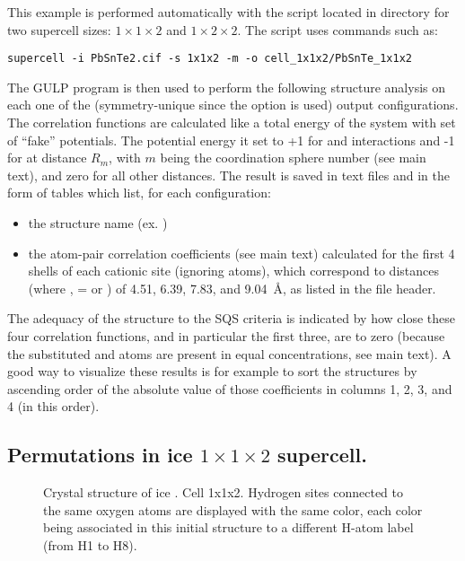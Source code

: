 \documentclass[a4paper,10pt]{article}
\begin{document}
This example is performed automatically with the script  located in directory  for two supercell sizes: $1\times1\times2$ and $1\times2\times2$. The script uses \sups{} commands such as:
\begin{Verbatim}[breaklines]
  supercell -i PbSnTe2.cif -s 1x1x2 -m -o cell_1x1x2/PbSnTe_1x1x2
\end{Verbatim}
The GULP program is then used to perform the following structure analysis on each one of the (symmetry-unique since the  option is used) output configurations. The correlation functions are calculated like a total energy of the system with set of ``fake'' potentials. The potential energy it set to +1 for  and  interactions and -1 for  at distance $R_m$, with $m$ being the coordination sphere number (see main text), and zero for all other distances. The result is saved in text files  and  in the form of tables which list, for each configuration:
\begin{itemize}
 \item the structure name (ex. )
 \item the atom-pair correlation coefficients (see main text) calculated for the first 4 shells of each cationic site (ignoring  atoms), which correspond to  distances (where ,  =  or ) of 4.51, 6.39, 7.83, and 9.04~\AA, as listed in the file header.
\end{itemize}
The adequacy of the structure to the SQS criteria is indicated by how close these four correlation functions, and in particular the first three, are to zero (because the substituted  and  atoms are present in equal concentrations, see main text). A good way to visualize these results is for example to sort the structures by ascending order of the absolute value of those coefficients in columns 1, 2, 3, and 4 (in this order).

\subsection*{Permutations in ice  $1\times1\times2$ supercell.}

\begin{figure}[t]
  \caption{ Crystal structure of ice . Cell 1x1x2. Hydrogen sites connected to the same oxygen atoms are displayed with the same color, each color being associated in this initial structure to a different H-atom label (from H1 to H8). }   
  
  \centering
  
  \label{fig:iceIh-adv}
\end{figure}
\end{document}
